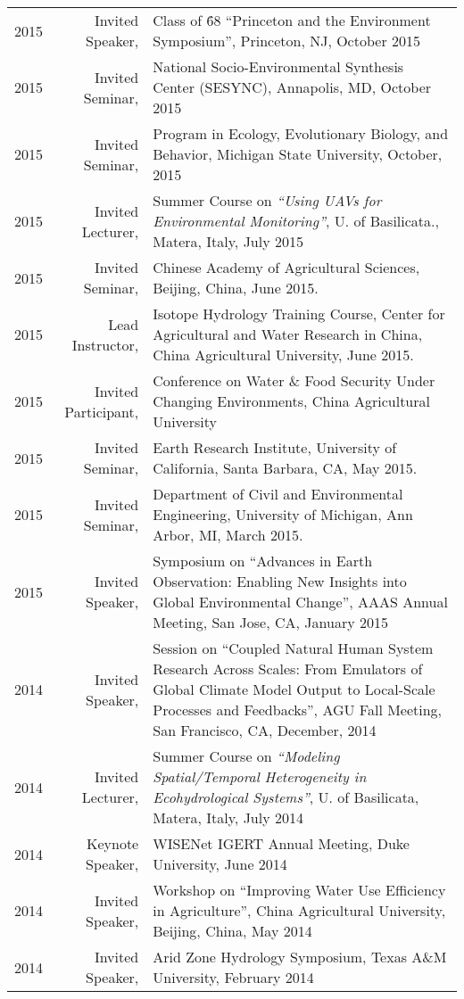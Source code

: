 \documentclass[10pt]{report}
\begin{document}
\begin{longtable}{p{.25in} r p{}}
2015 & Invited Speaker, & Class of \'68 ``Princeton and the Environment Symposium'', Princeton, NJ, October 2015 \\
2015 & Invited Seminar, & National Socio-Environmental Synthesis Center (SESYNC), Annapolis, MD, October 2015 \\
2015 & Invited Seminar, & Program in Ecology, Evolutionary Biology, and Behavior, Michigan State University, October, 2015 \\
2015 & Invited Lecturer, & Summer Course on \emph{``Using UAVs for Environmental Monitoring''}, U. of Basilicata., Matera, Italy, July 2015 \\
2015 & Invited Seminar, & Chinese Academy of Agricultural Sciences, Beijing, China, June 2015. \\
2015 & Lead Instructor, & Isotope Hydrology Training Course, Center for Agricultural and Water Research in China, China Agricultural University, June 2015. \\
2015  & Invited Participant, & Conference on Water \& Food Security Under Changing Environments, China Agricultural University \\
2015 & Invited Seminar, & Earth Research Institute, University of California, Santa Barbara, CA, May 2015. \\
2015 & Invited Seminar, & Department of Civil and Environmental Engineering, University of Michigan, Ann Arbor, MI, March 2015. \\
2015 & Invited Speaker, & Symposium on ``Advances in Earth Observation: Enabling New Insights into Global Environmental Change'', AAAS Annual Meeting, San Jose, CA, January 2015 \\
2014 & Invited Speaker, & Session on ``Coupled Natural Human System Research Across Scales: From Emulators of Global Climate Model Output to Local-Scale Processes and Feedbacks'', AGU Fall Meeting, San Francisco, CA, December, 2014 \\
2014 & Invited Lecturer, &  Summer Course on \emph{``Modeling Spatial/Temporal Heterogeneity in Ecohydrological Systems''}, U. of Basilicata, Matera, Italy, July 2014 \\
2014 & Keynote Speaker, & WISENet IGERT Annual Meeting, Duke University, June 2014 \\
2014 & Invited Speaker, & Workshop on ``Improving Water Use Efficiency in Agriculture'', China Agricultural University, Beijing, China, May 2014 \\
2014 & Invited Speaker, & Arid Zone Hydrology Symposium, Texas A\&M University, February 2014 \\

\end{longtable}
\end{document}
